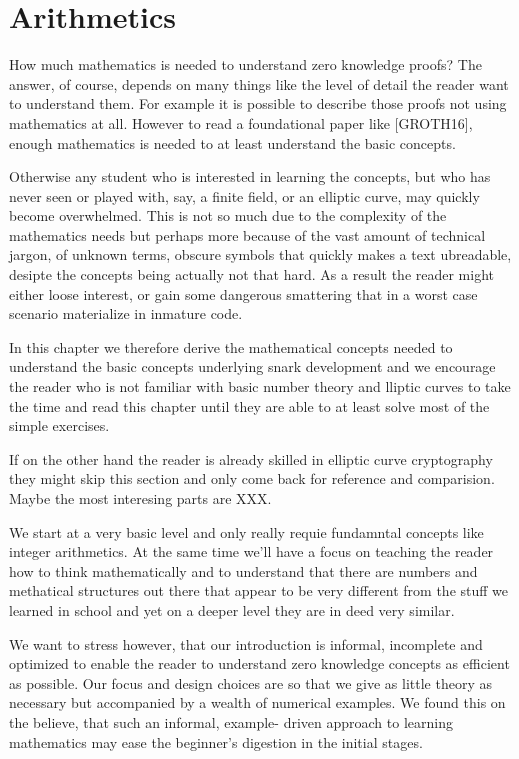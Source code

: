 \chapter{Arithmetics}
How much mathematics is needed to understand zero knowledge proofs? The answer, of course, depends on many things like the level of detail the reader want to understand them. For example it is possible to describe those proofs not using mathematics at all. However to read a foundational paper like [GROTH16], enough mathematics is needed to at least understand the basic concepts. 

Otherwise any student who is interested in learning the concepts, but who
has never seen or played with, say, a finite field, or an elliptic curve, may quickly become overwhelmed. This is not so much due to the complexity of the mathematics needs but perhaps more because of the vast amount of technical jargon, of unknown terms, obscure symbols that quickly makes a text ubreadable, desipte the concepts being actually not that hard. As a result the reader might either loose interest, or gain some dangerous smattering that in a worst case scenario materialize in inmature code. 

In this chapter we therefore derive the mathematical concepts needed to understand the basic concepts underlying snark development and we encourage the reader who is not familiar with basic number theory and lliptic curves to take the time and read this chapter until they are able to at least solve most of the simple exercises. 

If on the other hand the reader is already skilled in elliptic curve cryptography they might skip this section and only come back for reference and comparision. Maybe the most interesing parts are XXX.

We start at a very basic level and only really requie fundamntal concepts like integer arithmetics. At the same time we'll have a focus on teaching the reader how to think mathematically and to understand that there are numbers and methatical structures out there that appear to be very different from the stuff we learned in school and yet on a deeper level they are in deed very similar.

We want to stress however, that our introduction is informal, incomplete and optimized to enable the reader to understand zero knowledge concepts as efficient as possible. Our focus and design choices are so that we give as little theory as necessary but accompanied by a wealth of numerical examples. We found this on the believe, that such an informal, example-
driven approach to learning mathematics may ease the beginner’s digestion in the initial stages. 

